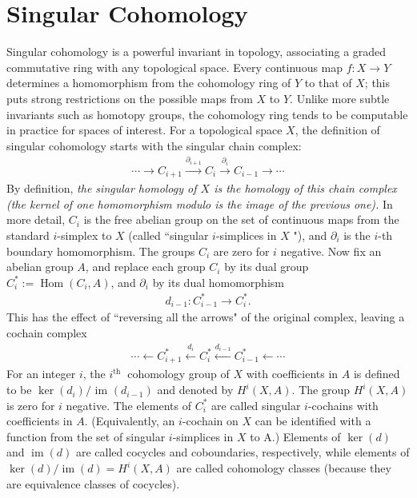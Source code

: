 \section{Singular Cohomology}
Singular cohomology is a powerful invariant in topology, associating a graded commutative ring with any topological space. Every continuous map $f \colon X \rightarrow Y$ determines a homomorphism from the cohomology ring of $Y$ to that of $X$; this puts strong restrictions on the possible maps from $X$ to $Y$. Unlike more subtle invariants such as homotopy groups, the cohomology ring tends to be computable in practice for spaces of interest.
For a topological space $X$, the definition of singular cohomology starts with the singular chain complex:
\begin{align*}
\cdots \rightarrow C_{i+1} \stackrel{\partial_{i+1}}{\rightarrow} C_i \stackrel{\partial_i}{\rightarrow} C_{i-1} \rightarrow \cdots
\end{align*}
By definition, \textit{the singular homology of $X$ is the homology of this chain complex (the kernel of one homomorphism modulo is the image of the previous one).} In more detail, $C_i$ is the free abelian group on the set of continuous maps from the standard $i$-simplex to $X$ (called ``singular $i$-simplices in $X$ "), and $\partial_i$ is the $i$-th boundary homomorphism. The groups $C_i$ are zero for $i$ negative.
Now fix an abelian group $A$, and replace each group $C_i$ by its dual group $C_i^*:=\operatorname{Hom}\left(C_i, A\right)$, and $\partial_i$ by its dual homomorphism
\begin{align*}
d_{i-1}: C_{i-1}^* \rightarrow C_i^*.
\end{align*}
This has the effect of ``reversing all the arrows" of the original complex, leaving a cochain complex
\begin{align*}
\cdots \leftarrow C_{i+1}^* \stackrel{d_i}{\leftarrow} C_i^* \stackrel{d_{i-1}}{\leftarrow} C_{i-1}^* \leftarrow \cdots
\end{align*}
For an integer $i$, the $i^{\text {th }}$ cohomology group of $X$ with coefficients in $A$ is defined to be $\operatorname{ker}\left(d_i\right) /$ im $\left(d_{i-1}\right)$ and denoted by $H^i(X, A)$. The group $H^i(X, A)$ is zero for $i$ negative. The elements of $C_i^*$ are called singular $i$-cochains with coefficients in $A$. (Equivalently, an $i$-cochain on $X$ can be identified with a function from the set of singular $i$-simplices in $X$ to A.) Elements of $\operatorname{ker}(d)$ and $\operatorname{im}(d)$ are called cocycles and coboundaries, respectively, while elements of $\operatorname{ker}(d) / \operatorname{im}(d)=H^i(X, A)$ are called cohomology classes (because they are equivalence classes of cocycles).

